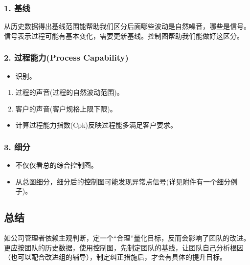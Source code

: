\hypertarget{ux57faux7ebf}{%
\subsubsection{1. 基线}\label{ux57faux7ebf}}

从历史数据得出基线范围能帮助我们区分后面哪些波动是自然噪音，哪些是信号。\\
信号表示过程可能有基本变化，需要更新基线。控制图帮助我们能做好这区分。

\hypertarget{ux8fc7ux7a0bux80fdux529bprocess-capability}{%
\subsubsection{2. 过程能力(Process
Capability)}\label{ux8fc7ux7a0bux80fdux529bprocess-capability}}

\begin{itemize}
\tightlist
\item
  识别。
\end{itemize}

\begin{enumerate}
\tightlist
\item
  过程的声音(过程的自然波动范围)。
\item
  客户的声音(客户规格上限下限)。
\end{enumerate}

\begin{itemize}
\tightlist
\item
  计算过程能力指数(Cpk)反映过程能多满足客户要求。
\end{itemize}

\hypertarget{ux7ec6ux5206}{%
\subsubsection{3. 细分}\label{ux7ec6ux5206}}

\begin{itemize}
\tightlist
\item
  不仅仅看总的综合控制图。
\item
  从总图细分，细分后的控制图可能发现异常点信号(详见附件有一个细分例子)。
\end{itemize}

\hypertarget{ux603bux7ed3}{%
\subsection{总结}\label{ux603bux7ed3}}

如公司管理者依赖主观判断，定一个``合理''量化目标，反而会影响了团队的改进。更应按团队的历史数据，使用控制图，先制定团队的基线，让团队自己分析根因（也可以配合改进组的辅导），制定纠正措施后，才会有具体的提升目标。

